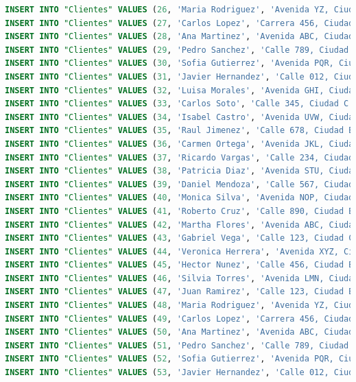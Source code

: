 \documentclass[12pt]{article}
\begin{document}
\begin{lstlisting}[language=SQL]
INSERT INTO "Clientes" VALUES (26, 'Maria Rodriguez', 'Avenida YZ, Ciudad H', '977-654-3210');
INSERT INTO "Clientes" VALUES (27, 'Carlos Lopez', 'Carrera 456, Ciudad C', '456-789-0123');
INSERT INTO "Clientes" VALUES (28, 'Ana Martinez', 'Avenida ABC, Ciudad A', '789-012-3456');
INSERT INTO "Clientes" VALUES (29, 'Pedro Sanchez', 'Calle 789, Ciudad B', '012-345-6789');
INSERT INTO "Clientes" VALUES (30, 'Sofia Gutierrez', 'Avenida PQR, Ciudad C', '345-678-9012');
INSERT INTO "Clientes" VALUES (31, 'Javier Hernandez', 'Calle 012, Ciudad A', '678-901-2345');
INSERT INTO "Clientes" VALUES (32, 'Luisa Morales', 'Avenida GHI, Ciudad B', '901-234-5678');
INSERT INTO "Clientes" VALUES (33, 'Carlos Soto', 'Calle 345, Ciudad C', '234-567-8901');
INSERT INTO "Clientes" VALUES (34, 'Isabel Castro', 'Avenida UVW, Ciudad A', '567-890-1234');
INSERT INTO "Clientes" VALUES (35, 'Raul Jimenez', 'Calle 678, Ciudad B', '890-123-4567');
INSERT INTO "Clientes" VALUES (36, 'Carmen Ortega', 'Avenida JKL, Ciudad C', '123-456-7890');
INSERT INTO "Clientes" VALUES (37, 'Ricardo Vargas', 'Calle 234, Ciudad A', '456-789-0123');
INSERT INTO "Clientes" VALUES (38, 'Patricia Diaz', 'Avenida STU, Ciudad B', '789-012-3456');
INSERT INTO "Clientes" VALUES (39, 'Daniel Mendoza', 'Calle 567, Ciudad C', '012-345-6789');
INSERT INTO "Clientes" VALUES (40, 'Monica Silva', 'Avenida NOP, Ciudad A', '345-678-9012');
INSERT INTO "Clientes" VALUES (41, 'Roberto Cruz', 'Calle 890, Ciudad B', '678-901-2345');
INSERT INTO "Clientes" VALUES (42, 'Martha Flores', 'Avenida ABC, Ciudad C', '901-234-5678');
INSERT INTO "Clientes" VALUES (43, 'Gabriel Vega', 'Calle 123, Ciudad C', '234-567-8901');
INSERT INTO "Clientes" VALUES (44, 'Veronica Herrera', 'Avenida XYZ, Ciudad A', '567-890-1234');
INSERT INTO "Clientes" VALUES (45, 'Hector Nunez', 'Calle 456, Ciudad B', '890-123-4567');
INSERT INTO "Clientes" VALUES (46, 'Silvia Torres', 'Avenida LMN, Ciudad C', '123-456-7890');
INSERT INTO "Clientes" VALUES (47, 'Juan Ramirez', 'Calle 123, Ciudad B', '123-987-6543');
INSERT INTO "Clientes" VALUES (48, 'Maria Rodriguez', 'Avenida YZ, Ciudad H', '977-654-3210');
INSERT INTO "Clientes" VALUES (49, 'Carlos Lopez', 'Carrera 456, Ciudad C', '456-789-0123');
INSERT INTO "Clientes" VALUES (50, 'Ana Martinez', 'Avenida ABC, Ciudad A', '789-012-3456');
INSERT INTO "Clientes" VALUES (51, 'Pedro Sanchez', 'Calle 789, Ciudad B', '012-345-6789');
INSERT INTO "Clientes" VALUES (52, 'Sofia Gutierrez', 'Avenida PQR, Ciudad C', '345-678-9012');
INSERT INTO "Clientes" VALUES (53, 'Javier Hernandez', 'Calle 012, Ciudad A', '678-901-2345');

\end{lstlisting}
\end{document}
